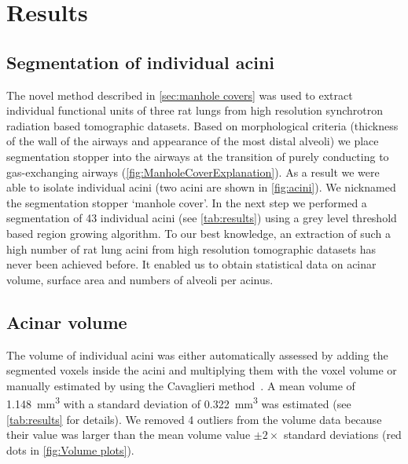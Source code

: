 \documentclass[a4paper,DIV=calc,abstract,english]{scrartcl}
\newcommand{\numberofacini}{43}
\newcommand{\numberofoutliers}{4} %
\newcommand{\biggerthan}{2} %
\newcommand{\meanacinarvolume}{1.148} %
\newcommand{\meanacinarvolumeSTD}{0.322} %
\begin{document}
\section{Results}
\label{sec:results}
\subsection{Segmentation of individual acini}
The novel method described in \autoref{sec:manhole covers} was used to extract individual functional units of three rat lungs from high resolution synchrotron radiation based tomographic datasets.
Based on morphological criteria (thickness of the wall of the airways and appearance of the most distal alveoli) we place segmentation stopper into the airways at the transition of purely conducting to gas-exchanging airways (\autoref{fig:ManholeCoverExplanation}).
As a result we were able to isolate individual acini (two acini are shown in \autoref{fig:acini}).
We nicknamed the segmentation stopper ‘manhole cover’.
In the next step we performed a segmentation of \numberofacini\xspace individual acini (see \autoref{tab:results}) using a grey level threshold based region growing algorithm.
To our best knowledge, an extraction of such a high number of rat lung acini from high resolution tomographic datasets has never been achieved before.
It enabled us to obtain statistical data on acinar volume, surface area and numbers of alveoli per acinus.

\subsection{Acinar volume}
The volume of individual acini was either automatically assessed by adding the segmented voxels inside the acini and multiplying them with the voxel volume or manually estimated by using the Cavaglieri method~\citep{Hsia2010}.
A mean volume of \SI{\meanacinarvolume}{\milli\meter\cubed} with a standard deviation of \SI{\meanacinarvolumeSTD}{\milli\meter\cubed} was estimated (see \autoref{tab:results} for details).
We removed \numberofoutliers\xspace outliers from the volume data because their value was larger than the mean volume value \(\pm\biggerthan\times\) standard deviations (red dots in \autoref{fig:Volume plots}).
\end{document}

